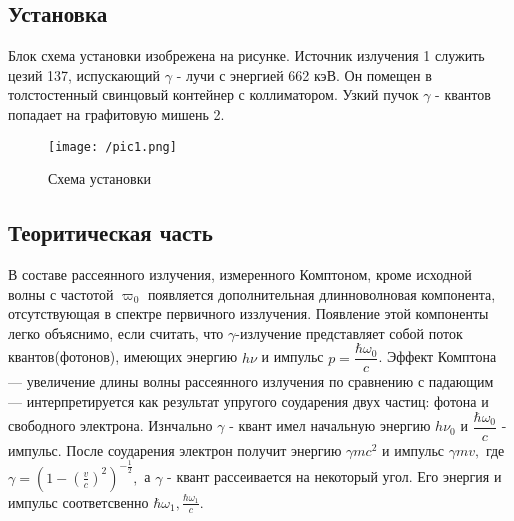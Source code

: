 \documentclass[a4paper,12pt]{article}
\theoremstyle{plain} %
\theoremstyle{definition} %
\theoremstyle{remark} %
\begin{document}
\begin{minipage}{0.45\textwidth}
  
\subsection{Установка}
Блок схема установки изобрежена на рисунке. Источник излучения 1 служить цезий 137, испускающий $\gamma$ - лучи с энергией 662 кэВ. Он помещен в толстостенный свинцовый контейнер с коллиматором. Узкий пучок $\gamma$ - квантов попадает на графитовую мишень 2.

\begin{figure}[H]
        \texttt{[image: /pic1.png]}
    \caption{Схема установки}
\end{figure}

\subsection{Теоритическая часть}

В составе рассеянного излучения, измеренного Комптоном, кроме исходной волны с частотой $\varpi_0$ появляется дополнительная длинноволновая компонента, отсутствующая в спектре первичного иззлучения. Появление этой компоненты легко объяснимо, если считать, что $\gamma$-излучение представляет собой поток квантов(фотонов), имеющих энергию $h \nu $ и импульс $p = \dfrac{\hbar \omega_0}{c}$.
Эффект Комптона — увеличение длины волны рассеянного излучения по сравнению с падающим — интерпретируется как результат упругого соударения двух частиц: фотона и свободного электрона. Изнчально $\gamma$ - квант имел начальную энергию $h \nu_0 $ и $\dfrac{\hbar \omega_0}{c}$ - импульс. После соударения электрон получит энергию $\gamma m c^2$ и импульс $\gamma m v,$ где $\gamma = \left(1 - \left(\frac{v}{c}\right)^2\right)^{-\frac{1}{2}},$ а $\gamma$ - квант рассеивается на некоторый угол. Его энергия и импульс соответсвенно $\hbar\omega_1, \frac{\hbar\omega_1}{c}.$\par

\end{minipage}
\hfill
\end{document}
